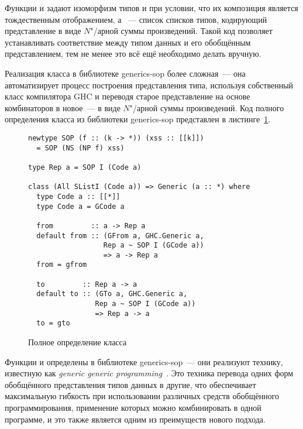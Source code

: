 Функции  и  задают изоморфизм типов  и  при условии, что их композиция является тождественным отображением, а ~--- список списков типов, кодирующий представление в виде $N$"/арной суммы произведений. Такой код позволяет устанавливать соответствие между типом данных и его обобщённым представлением, тем не менее это всё ещё необходимо делать вручную.

Реализация класса  в библиотеке \textsf{generics-sop} более сложная~--- она автоматизирует процесс построения представления типа, используя собственный класс  компилятора \textsf{GHC} и переводя старое представление на основе комбинаторов в новое~--- в виде $N$"/арной суммы произведений. Код полного определения класса  из библиотеки \textsf{generics-sop} представлен в листинге~\ref{list:generics-sop-generic}.
\begin{figure}[h]
\begin{framed}
\vspace{-0.25cm}
\begin{lstlisting}
newtype SOP (f :: (k -> *)) (xss :: [[k]])
  = SOP (NS (NP f) xss)
  
type Rep a = SOP I (Code a)

class (All SListI (Code a)) => Generic (a :: *) where
  type Code a :: [[*]]
  type Code a = GCode a

  from         :: a -> Rep a
  default from :: (GFrom a, GHC.Generic a,
                  Rep a ~ SOP I (GCode a))
                  => a -> Rep a
  from = gfrom

  to         :: Rep a -> a
  default to :: (GTo a, GHC.Generic a,
                Rep a ~ SOP I (GCode a))
                => Rep a -> a
  to = gto
\end{lstlisting}
\vspace{-0.25cm}
\end{framed}
\caption{Полное определение класса }
\label{list:generics-sop-generic}
\end{figure}

Функции  и  определены в библиотеке \textsf{generics-sop}~--- они реализуют технику, известную как \textsl{generic generic programming}~\cite{GGP2014}. Это техника перевода одних форм обобщённого представления типов данных в другие, что обеспечивает максимальную гибкость при использовании различных средств обобщённого программирования, применение которых можно комбинировать в одной программе, и это также является одним из преимуществ нового подхода.

